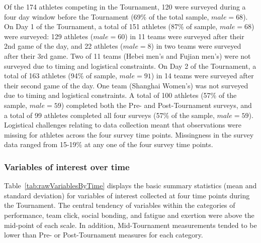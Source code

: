 \begin{CJK}{UTF8}{gbsn}
Of the 174 athletes competing in the Tournament, 120 were surveyed during a four day window before the Tournament (69\% of the total sample, $male = 68$).  On Day 1 of the Tournament, a total of 151 athletes (87\% of sample, $male = 68$) were surveyed: 129 athletes ($male = 60$) in 11 teams were surveyed after their 2nd game of the day, and 22 athletes ($male = 8$) in two teams were surveyed after their 3rd game. Two of 11 teams (Hebei men’s and Fujian men’s) were not surveyed due to timing and logistical constraints.  On Day 2 of the Tournament, a total of 163 athletes (94\% of sample, $male = 91$) in 14 teams were surveyed after their second game of the day. One team (Shanghai Women’s) was not surveyed due to timing and logistical constraints.  A total of 100 athletes (57\% of the sample, $male = 59$) completed both the Pre- and Post-Tournament surveys, and a total of 99 athletes completed all four surveys (57\% of the sample, $male = 59$). Logistical challenges relating to data collection meant that observations were missing for athletes across the four survey time points. Missingness in the survey data ranged from 15-19\% at any one of the four survey time points.\\


\subsubsection{Variables of interest over time}
Table~\ref{tab:rawVariablesByTime} displays the basic summary statistics (mean and standard deviation) for variables of interest collected at four time points during the Tournament.  The central tendency of variables within the categories of performance, team click, social bonding, and fatigue and exertion were above the mid-point of each scale.  In addition, Mid-Tournament measurements tended to be lower than Pre- or Post-Tournament measures for each category.




\end{CJK}

